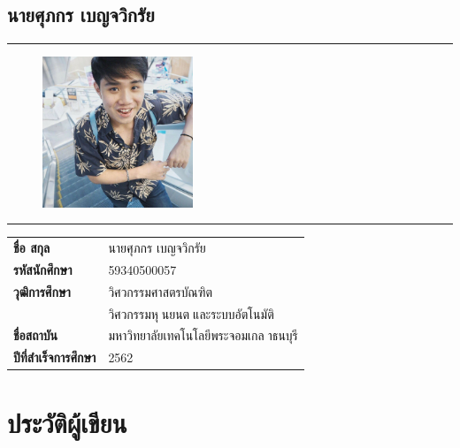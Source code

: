 \section*{นายศุภกร เบญจวิกรัย}
\hrule height .7pt
\begin{figure}[!ht]
	\centering
	\includegraphics[width=0.4\textwidth]{pages/images/first.jpg}
\end{figure}
\hrule height .7pt
\raggedright
\begin{tabular}{p{} p{}}
    \textbf{ชื่อ สกุล} & {นายศุภกร เบญจวิกรัย} \\
    \textbf{รหัสนักศึกษา} & {59340500057}\\
    \textbf{วุฒิการศึกษา} & {วิศวกรรมศาสตรบัณฑิต} \\
    {} & {วิศวกรรมหุนยนตและระบบอัตโนมัติ}\\
    \textbf{ชื่อสถาบัน} & {มหาวิทยาลัยเทคโนโลยีพระจอมเกลาธนบุรี} \\
    \textbf{ปีที่สำเร็จการศึกษา} & {2562} \\
\end{tabular}   

\chapter*{ประวัติผู้เขียน}

